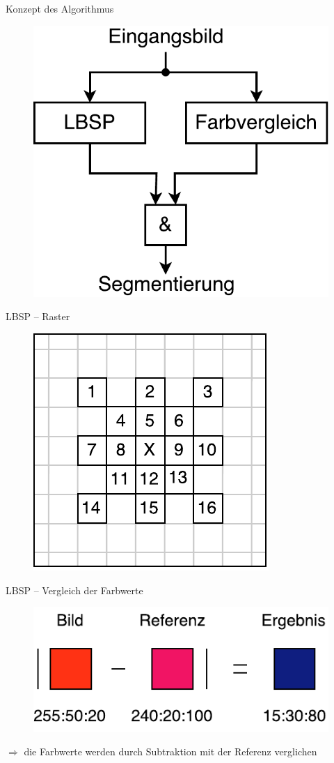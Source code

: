 \documentclass[hyperref={pdfpagelabels=false}]{beamer}
\begin{document}
\begin{frame}[t]{Konzept des Algorithmus}
	\begin{figure}
		\centering
		\includegraphics[width=0.6\linewidth]{Abbildungen/Konzept.pdf}
		\label{fig:Abbildungen/Grid}
	\end{figure}
\end{frame}


\begin{frame}[t]{LBSP -- Raster}
	\centering
	\begin{figure}
		\centering
		\includegraphics[width=0.45\linewidth]{Abbildungen/Grid.pdf}
		\label{fig:Abbildungen/Grid}
	\end{figure}

\end{frame}

\begin{frame}[t]{LBSP -- Vergleich der Farbwerte}
	\bigskip
	\bigskip
	\bigskip

	\begin{figure}
		\centering
		\includegraphics[width=0.6\linewidth]{Abbildungen/Farb_Vergleich.pdf}
		\label{fig:Abbildungen/Grid}
	\end{figure}
	\centering
	\bigskip
	$\Rightarrow$ die Farbwerte werden durch Subtraktion mit der Referenz verglichen
\end{frame}
\end{document}
